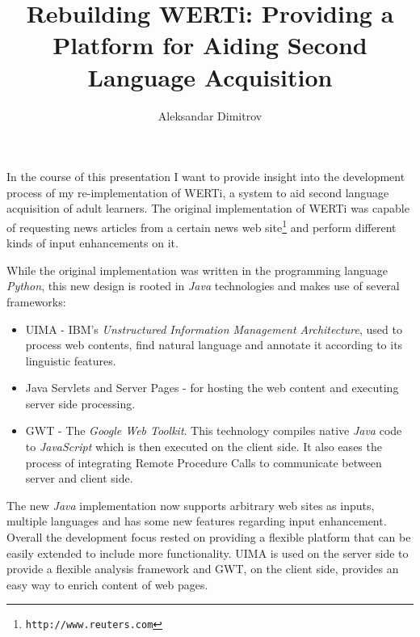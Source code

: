 \documentclass[a4paper,twocolumn]{scrartcl}
\author{Aleksandar Dimitrov}
\title{Rebuilding WERTi: Providing a Platform for Aiding Second Language Acquisition}
\begin{document}
\maketitle

In the course of this presentation I want to provide insight into the
development process of my re-implementation of WERTi, a system to aid second
language acquisition of adult learners. The original implementation of WERTi was
capable of requesting news articles from a certain news web
site\footnote{\texttt{http://www.reuters.com}} and perform different kinds of
input enhancements on it.

While the original implementation was written in the programming language
\emph{Python}, this new design is rooted in \emph{Java} technologies and makes
use of several frameworks:
\begin{itemize}
  \item UIMA - IBM's \emph{Unstructured Information Management Architecture},
    used to process web contents, find natural
    language and annotate it according to its linguistic features.
  \item Java Servlets and Server Pages - for hosting the web content and
    executing server side processing.
  \item GWT - The \emph{Google Web Toolkit}. This technology compiles native
    \emph{Java} code to \emph{JavaScript} which is then executed on the client
    side. It also eases the process of integrating Remote Procedure Calls to
    communicate between server and client side.
\end{itemize}

The new \emph{Java} implementation now supports arbitrary web sites as inputs,
multiple languages and has some new features regarding input enhancement.
Overall the development focus rested on providing a flexible platform that can be
easily extended to include more functionality. UIMA is used on the server side
to provide a flexible analysis framework and GWT, on the client side, provides
an easy way to enrich content of web pages.
\end{document}
